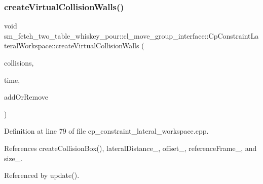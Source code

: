 \subsubsection{\texorpdfstring{create\+Virtual\+Collision\+Walls()}{createVirtualCollisionWalls()}}
{\footnotesize\ttfamily void sm\+\_\+fetch\+\_\+two\+\_\+table\+\_\+whiskey\+\_\+pour\+::cl\+\_\+move\+\_\+group\+\_\+interface\+::\+Cp\+Constraint\+Lateral\+Workspace\+::create\+Virtual\+Collision\+Walls (\begin{DoxyParamCaption}\item[{std\+::vector$<$ moveit\+\_\+msgs\+::\+Collision\+Object $>$ \&}]{collisions,  }\item[{const ros\+::\+Time \&}]{time,  }\item[{int}]{add\+Or\+Remove }\end{DoxyParamCaption})}



Definition at line 79 of file cp\+\_\+constraint\+\_\+lateral\+\_\+workspace.\+cpp.



References create\+Collision\+Box(), lateral\+Distance\+\_\+, offset\+\_\+, reference\+Frame\+\_\+, and size\+\_\+.



Referenced by update().


